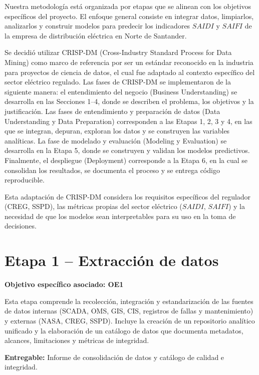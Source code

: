 

Nuestra metodología está organizada por etapas que se alinean con los objetivos específicos del proyecto. El enfoque general consiste en integrar datos, limpiarlos, analizarlos y construir modelos para predecir los indicadores $SAIDI$ y $SAIFI$ de la empresa de distribución eléctrica en Norte de Santander.

Se decidió utilizar CRISP-DM (Cross-Industry Standard Process for Data Mining) como marco de referencia por ser un estándar reconocido en la industria para proyectos de ciencia de datos, el cual fue adaptado al contexto específico del sector eléctrico regulado. Las fases de CRISP-DM se implementaron de la siguiente manera: el entendimiento del negocio (Business Understanding) se desarrolla en las Secciones 1–4, donde se describen el problema, los objetivos y la justificación. Las fases de entendimiento y preparación de datos (Data Understanding y Data Preparation) corresponden a las Etapas 1, 2, 3 y 4, en las que se integran, depuran, exploran los datos y se construyen las variables analíticas. La fase de modelado y evaluación (Modeling y Evaluation) se desarrolla en la Etapa 5, donde se construyen y validan los modelos predictivos. Finalmente, el despliegue (Deployment) corresponde a la Etapa 6, en la cual se consolidan los resultados, se documenta el proceso y se entrega código reproducible.

Esta adaptación de CRISP-DM considera los requisitos específicos del regulador (CREG, SSPD), las métricas propias del sector eléctrico ($SAIDI$, $SAIFI$) y la necesidad de que los modelos sean interpretables para su uso en la toma de decisiones.

\section{Etapa 1 – Extracción de datos}


\textbf{Objetivo específico asociado: OE1}

Esta etapa comprende la recolección, integración y estandarización de las fuentes de datos internas (SCADA, OMS, GIS, CIS, registros de fallas y mantenimiento) y externas (NASA, CREG, SSPD). Incluye la creación de un repositorio analítico unificado y la elaboración de un catálogo de datos que documenta metadatos, alcances, limitaciones y métricas de integridad.

\textbf{Entregable:} Informe de consolidación de datos y catálogo de calidad e integridad.

